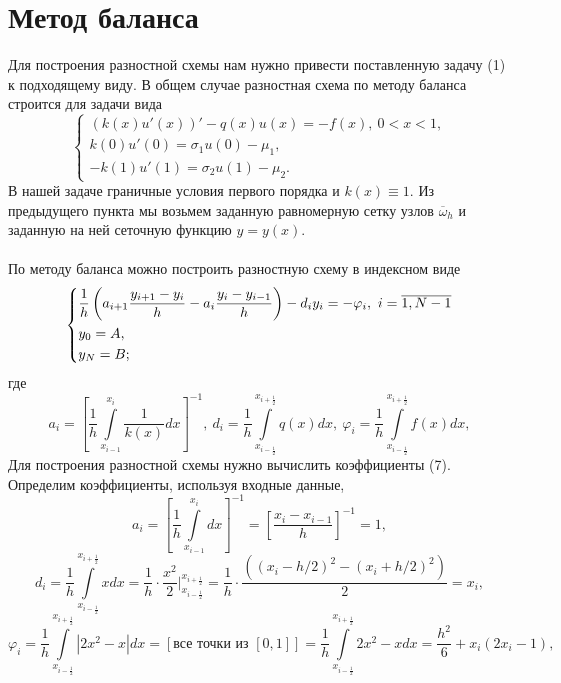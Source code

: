 \documentclass[a4paper, 12pt]{article}
\begin{document}
    \hypertarget{ux43cux435ux442ux43eux434-ux431ux430ux43bux430ux43dux441ux430}{%
\section{Метод
баланса}\label{ux43cux435ux442ux43eux434-ux431ux430ux43bux430ux43dux441ux430}}

   Для построения разностной схемы нам нужно привести поставленную задачу (1) к подходящему виду. В общем случае разностная схема по методу баланса строится для задачи вида 
   $$
   \begin{cases}
   	(k(x) u'(x))' - q(x)u(x) = -f(x), \ 0<x<1,\\
   	k(0) u'(0) = \sigma_1 u(0) - \mu_1,\\
   	- k(1) u'(1) = \sigma_2 u(1) - \mu_2.
   \end{cases}
   $$
   В нашей задаче граничные условия первого порядка и $k(x) \equiv 1$.
   Из предыдущего пункта мы возьмем заданную равномерную сетку узлов $\overline \omega_h$ и заданную на ней сеточную функцию $y = y(x)$.
   \\\\
   По методу баланса можно построить разностную схему в индексном виде
   \begin{equation}
   	\begin{dcases}
   		\dfrac{1}{h}\left(a_{i+1}\dfrac{y_{i+1} - y_i}{h} - a_i \dfrac{y_i - y_{i-1}}{h}\right)-d_iy_i = -\varphi_i,\ i=\overline {1,N-1}\\
   		y_0 = A,\\
   		y_N = B;
   	\end{dcases}
   \end{equation}
   где 
   \begin{equation}
   	a_i = \left[ \dfrac 1h \int\limits_{x_{i-1}}^{x_i} \dfrac{1}{k(x)}dx\right]^{-1},\
   	d_i =\dfrac 1h \int\limits_{x_{i-\frac12}}^{x_{i+\frac12}} q(x) dx,\
   	\varphi_i = \dfrac{1}{h} \int\limits_{x_{i-\frac12}}^{x_{i+\frac12}}f(x)dx,
   \end{equation}
   Для построения разностной схемы нужно вычислить коэффициенты (7).
   Определим коэффициенты, используя входные данные, 
   $$a_i = \left[ \dfrac 1h \int\limits_{x_{i-1}}^{x_i} dx\right]^{-1} = \left[\dfrac{x_i - x_{i-1}}{h}\right]^{-1} = 1,$$
   $$d_i=\dfrac 1h \int\limits_{x_{i-\frac12}}^{x_{i+\frac12}} x dx = \dfrac 1 h\cdot \dfrac {x^2}{2}\Big | _{x_{i-\frac12}}^{x_{i+\frac12}}=\dfrac 1h\cdot \dfrac{((x_i-h/2)^2 - (x_i+h/2)^2)}{2} = x_i,$$
   $$\varphi_i = \dfrac{1}{h} \int\limits_{x_{i-\frac12}}^{x_{i+\frac12}}|2x^2 - x|dx =[\text{все точки из } [0,1]] = \dfrac{1}{h} \int\limits_{x_{i-\frac12}}^{x_{i+\frac12}}2x^2 - xdx = \dfrac{h^2}{6} + x_i(2x_i-1),$$
\end{document}

